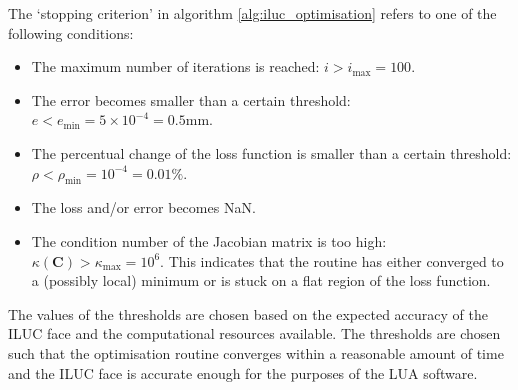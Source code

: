 The `stopping criterion' in algorithm \ref{alg:iluc_optimisation} refers to one of the following conditions:
\begin{itemize}
    \item The maximum number of iterations is reached: $i > i_{\text{max}} = 100$.
    \item The error becomes smaller than a certain threshold: $e < e_{\text{min}} = 5\times10^{-4} = 0.5 \text{mm}$.
    \item The percentual change of the loss function is smaller than a certain threshold: $\rho < \rho_{\text{min}} = 10^{-4} = 0.01\%$.
    \item The loss and/or error becomes NaN.
    \item The condition number of the Jacobian matrix is too high: $\kappa(\mathbf{C}) > \kappa_{\text{max}} = 10^6$. This indicates that the routine has either converged to a (possibly local) minimum or is stuck on a flat region of the loss function.
\end{itemize}
The values of the thresholds are chosen based on the expected accuracy of the ILUC face and the computational resources available. The thresholds are chosen such that the optimisation routine converges within a reasonable amount of time and the ILUC face is accurate enough for the purposes of the LUA software.

